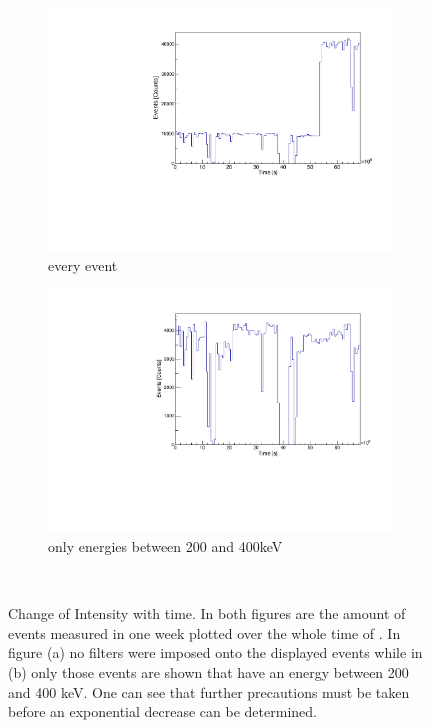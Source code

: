 \documentclass[encoding=utf8,british]{tumphthesis}
\begin{document}
\begin{figure}[t!]
	\centering
	\begin{subfigure}{.5\textwidth}
		\centering
		\includegraphics[width=\textwidth]{./Bilder/ZeitverlaufALLE.pdf}
		\caption{every event}
		\label{fig:ZeitAll}
	\end{subfigure}\hfill%
	\begin{subfigure}{.5\textwidth}
		\centering
		\includegraphics[width=\textwidth]{./Bilder/ZeitverlaufLimits.pdf}
		\caption{only energies between 200 and 400keV}
		\label{fig:ZeitLimits}
	\end{subfigure}
    \\
    \caption{Change of Intensity with time. In both figures are the amount of events measured in one week plotted over the whole time of \PII. In figure (a) no filters were imposed onto the displayed events while in (b) only those events are shown that have an energy between 200 and 400 keV. One can see that further precautions must be taken before an exponential decrease can be determined. }
\end{figure}
\end{document}
